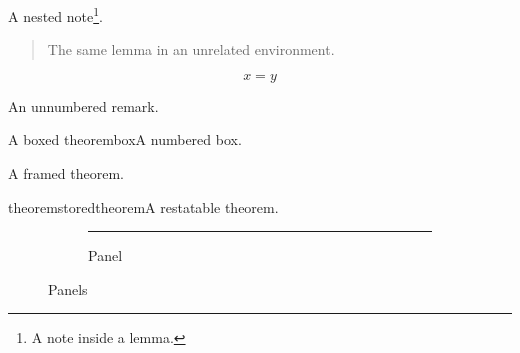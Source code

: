   \begin{lemma}\label{nt-title}
    A nested note\footnote{A note inside a lemma.\label{nt-footnote}}.
    \begin{quote}The same lemma in an unrelated environment.\label{nt-nested}\end{quote}
    \begin{equation}x=y\label{nt-equation}\end{equation}
  \end{lemma}
  \begin{remark}\label{nt-star}An unnumbered remark.\end{remark}
\fi
\ifdefined\WiseTcolorbox
  \begin{wisebox}{A boxed theorem}{box}A numbered box.\end{wisebox}
\fi
\ifdefined\WiseMdframed
  \begin{framedtheorem}\label{framed}A framed theorem.\end{framedtheorem}
\fi
\ifdefined\WiseRestatable
  \begin{restatable}{theorem}{storedtheorem}\label{restated}A restatable theorem.\end{restatable}
  \storedtheorem*
\fi
\begin{figure}[htbp]\centering
  \ifdefined\WiseSubfig
    \subfloat[Panel]{\rule{20mm}{3mm}\label{panel}}
  \else
    \begin{subfigure}{.4\linewidth}\centering\rule{20mm}{3mm}\caption{Panel}\label{panel}\end{subfigure}
  \fi
  \caption{Panels}\label{panels}
\end{figure}
\ifdefined\WiseEnumitem
